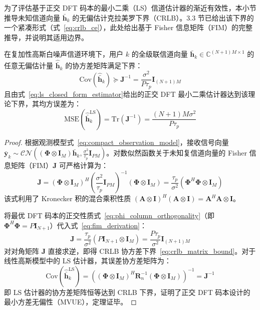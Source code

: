 为了评估基于正交 DFT 码本的最小二乘（LS）信道估计器的渐近有效性，本小节推导未知信道向量 $\bar{\bm{h}}_k$ 的无偏估计克拉美罗下界（CRLB）。3.3 节已给出该下界的一个紧凑形式（式~\eqref{eq:crlb_ce}），此处给出基于 Fisher 信息矩阵（FIM）的完整推导，并说明其适用边界。

\begin{theorem}
  \label{thm:crlb_derivation}
  在复加性高斯白噪声信道环境下，用户 $k$ 的全级联信道向量 $\bar{\bm{h}}_k \in \mathbb{C}^{(N+1)M \times 1}$ 的任意无偏估计量 $\hat{\bar{\bm{h}}}_k$ 的协方差矩阵满足下界：
  \begin{equation}
    \mathrm{Cov}\left( \hat{\bar{\bm{h}}}_k \right) \succeq \bm{J}^{-1} = \frac{\sigma^2}{P \tau_p} \bm{I}_{(N+1)M}
    \label{eq:crlb_matrix_bound}
  \end{equation}
  且由式~\eqref{eq:ls_closed_form_estimator}给出的正交 DFT 最小二乘估计器达到该理论下界，其均方误差为：
  \begin{equation}
    \mathrm{MSE}(\hat{\bar{\bm{h}}}_k^{\mathrm{LS}}) = \mathrm{Tr}(\bm{J}^{-1}) = \frac{(N+1)M \sigma^2}{P \tau_p}
    \label{eq:crlb_trace_mse}
  \end{equation}
\end{theorem}

\begin{proof}
  根据观测模型式~\eqref{eq:compact_observation_model}，接收信号向量 $\bar{\bm{y}}_k \sim \mathcal{CN}\left( (\bm{\Phi} \otimes \bm{I}_M)\bar{\bm{h}}_k, \frac{\sigma^2}{\tau_p}\bm{I}_{PM} \right)$。对数似然函数关于未知复信道向量的 Fisher 信息矩阵（FIM）$\bm{J}$ 可严格计算为：
  \begin{equation}
    \bm{J} = \left( \bm{\Phi} \otimes \bm{I}_M \right)^H \left( \frac{\sigma^2}{\tau_p}\bm{I}_{PM} \right)^{-1} \left( \bm{\Phi} \otimes \bm{I}_M \right) = \frac{\tau_p}{\sigma^2} \left( \bm{\Phi}^H \bm{\Phi} \otimes \bm{I}_M \right)
    \label{eq:fim_derivation}
  \end{equation}
  该式利用了 Kronecker 积的混合乘积性质 $(\bm{A}\otimes\bm{I})^H(\bm{A}\otimes\bm{I}) = \bm{A}^H\bm{A}\otimes\bm{I}$。

  将最优 DFT 码本的正交性质式~\eqref{eq:phi_column_orthogonality}（即 $\bm{\Phi}^H \bm{\Phi} = P \bm{I}_{N+1}$）代入式~\eqref{eq:fim_derivation}：
  \begin{equation}
    \bm{J} = \frac{\tau_p}{\sigma^2} \left( P \bm{I}_{N+1} \otimes \bm{I}_M \right) = \frac{P \tau_p}{\sigma^2} \bm{I}_{(N+1)M}
    \label{eq:fim_orthogonal_result}
  \end{equation}
  对对角矩阵 $\bm{J}$ 直接求逆，即得 CRLB 协方差下界~\eqref{eq:crlb_matrix_bound}。对于线性高斯模型中的 LS 估计器，其误差协方差矩阵为：
  \begin{equation}
    \mathrm{Cov}\left( \hat{\bar{\bm{h}}}_k^{\mathrm{LS}} \right) = \left( (\bm{\Phi} \otimes \bm{I}_M)^H \bm{R}_n^{-1} (\bm{\Phi} \otimes \bm{I}_M) \right)^{-1} = \bm{J}^{-1}
    \label{eq:ls_attains_crlb}
  \end{equation}
  即 LS 估计器的协方差矩阵恒等达到 CRLB 下界，证明了正交 DFT 码本设计的最小方差无偏性（MVUE），定理证毕。
\end{proof}

